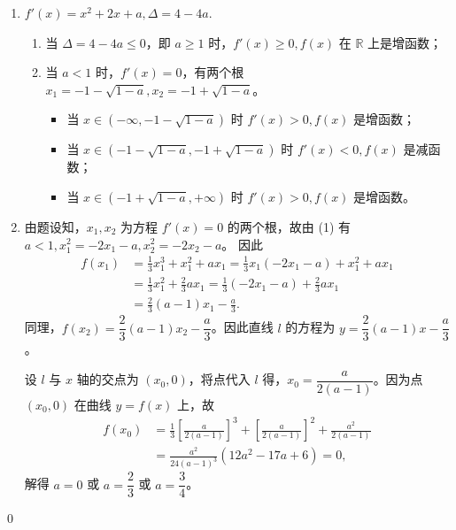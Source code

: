 \begin{jie}
    \begin{enumerate}
        \item $f'(x) = x^2 + 2x + a, \Delta = 4 - 4a$.
        \begin{enumerate}
            \item 当 $\Delta = 4 - 4a \leq 0$，即 $a \geq 1$ 时，$f'(x) \geq 0, f(x)$ 在 $\mathbb{R}$ 上是增函数；
            \item 当 $a < 1$ 时，$f'(x) = 0$，有两个根 $x_1 = -1 - \sqrt{1-a}, x_2 = -1 + \sqrt{1-a}$。
            \begin{itemize}
                \item 当 $x \in (-\infty, -1 - \sqrt{1-a})$ 时 $f'(x) > 0, f(x)$ 是增函数；
                \item 当 $x \in (-1 - \sqrt{1-a}, -1 + \sqrt{1-a})$ 时 $f'(x) < 0, f(x)$ 是减函数；
                \item 当 $x \in (-1 + \sqrt{1-a}, +\infty)$ 时 $f'(x) > 0, f(x)$ 是增函数。
            \end{itemize}
        \end{enumerate}
        \item 由题设知，$x_1, x_2$ 为方程 $f'(x) = 0$ 的两个根，故由 (1) 有 $a < 1, x_1^2 = -2x_1 - a, x_2^2 = -2x_2 - a$。
        因此
        \begin{align*}
     f(x_1) &= \frac{1}{3}x_1^3 + x_1^2 + ax_1 = \frac{1}{3}x_1(-2x_1 - a) + x_1^2 + ax_1 \\
            &= \frac{1}{3}x_1^2 + \frac{2}{3}ax_1 = \frac{1}{3}(-2x_1 - a) + \frac{2}{3}ax_1 \\
            &= \frac{2}{3}(a-1)x_1 - \frac{a}{3}.
        \end{align*}
        同理，$f(x_2) = \dfrac{2}{3}(a-1)x_2 - \dfrac{a}{3}$。因此直线 $l$ 的方程为 $y = \dfrac{2}{3}(a-1)x - \dfrac{a}{3}$。
    
        设 $l$ 与 $x$ 轴的交点为 $(x_0, 0)$，将点代入 $l$ 得，$x_0 = \dfrac{a}{2(a-1)}$。因为点 $(x_0, 0)$ 在曲线 $y = f(x)$ 上，故
        \begin{align*}
          f(x_0) &= \frac{1}{3}\left[\frac{a}{2(a-1)}\right]^3 + \left[\frac{a}{2(a-1)}\right]^2 + \frac{a^2}{2(a-1)} \\
            &= \frac{a^2}{24(a-1)^3}(12a^2 - 17a + 6) = 0,
        \end{align*}
        解得 $a = 0$ 或 $a = \dfrac{2}{3}$ 或 $a = \dfrac{3}{4}$。
    \end{enumerate}
\qed
\end{jie}

